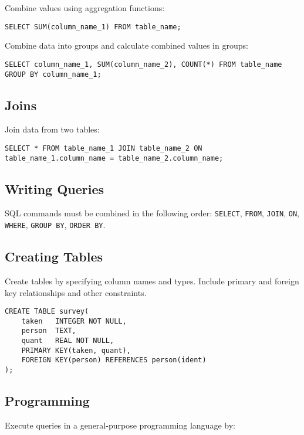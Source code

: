 Combine values using aggregation functions:

\begin{Verbatim}
SELECT SUM(column_name_1) FROM table_name;
\end{Verbatim}

Combine data into groups and calculate combined values in groups:

\begin{Verbatim}
SELECT column_name_1, SUM(column_name_2), COUNT(*) FROM table_name GROUP BY column_name_1;
\end{Verbatim}

\subsection*{Joins}

Join data from two tables:

\begin{Verbatim}
SELECT * FROM table_name_1 JOIN table_name_2 ON table_name_1.column_name = table_name_2.column_name;
\end{Verbatim}

\subsection*{Writing Queries}

SQL commands must be combined in the following order: \texttt{SELECT},
\texttt{FROM}, \texttt{JOIN}, \texttt{ON}, \texttt{WHERE},
\texttt{GROUP BY}, \texttt{ORDER BY}.

\subsection*{Creating Tables}

Create tables by specifying column names and types. Include primary and
foreign key relationships and other constraints.

\begin{Verbatim}
CREATE TABLE survey(
    taken   INTEGER NOT NULL,
    person  TEXT,
    quant   REAL NOT NULL,
    PRIMARY KEY(taken, quant),
    FOREIGN KEY(person) REFERENCES person(ident)
);
\end{Verbatim}

\subsection*{Programming}

Execute queries in a general-purpose programming language by:

